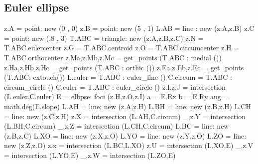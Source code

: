 \subsection{Euler ellipse} %
\label{sub:hexagram}
\begin{tkzexample}[latex=0cm,small,code only]
\begin{tkzelements}
   z.A               = point: new (0 , 0)
   z.B               = point: new (5 , 1)
   L.AB              = line : new (z.A,z.B)
   z.C               = point: new (.8 , 3)
   T.ABC             = triangle: new (z.A,z.B,z.C)
   z.N               = T.ABC.eulercenter
   z.G               = T.ABC.centroid
   z.O               = T.ABC.circumcenter
   z.H               = T.ABC.orthocenter
   z.Ma,z.Mb,z.Mc    = get_points (T.ABC : medial ())
   z.Ha,z.Hb,z.Hc    = get_points (T.ABC : orthic ())   
   z.Ea,z.Eb,z.Ec    = get_points (T.ABC: extouch())
   L.euler           = T.ABC : euler_line () 
   C.circum          = T.ABC : circum_circle () 
   C.euler           = T.ABC : euler_circle () 
   z.I,z.J           = intersection (L.euler,C.euler) 
   E                 = ellipse: foci (z.H,z.O,z.I)  
   a                 = E.Rx
   b                 = E.Ry
   ang               = math.deg(E.slope)
   L.AH              = line: new (z.A,z.H)
   L.BH              = line: new (z.B,z.H)
   L.CH              = line: new (z.C,z.H)
   z.X               = intersection (L.AH,C.circum)  
   _,z.Y             = intersection (L.BH,C.circum)  
   _,z.Z             = intersection (L.CH,C.circum)  
   L.BC              = line: new (z.B,z.C) 
   L.XO              = line: new (z.X,z.O)
   L.YO              = line: new (z.Y,z.O)
   L.ZO              = line: new (z.Z,z.O)
   z.x               = intersection (L.BC,L.XO)
   z.U               = intersection (L.XO,E)
  _,z.V              = intersection (L.YO,E)
  _,z.W              = intersection (L.ZO,E)
 \end{tkzelements}
 \end{tkzexample}

\begin{tkzexample}[latex=0cm,small,code only] 
\end{tkzexample}

